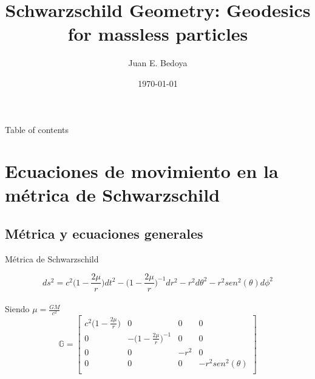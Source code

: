 \documentclass[xcolor=dvipsnames]{beamer}
\title[Schwarzschild geometry]{Schwarzschild Geometry: Geodesics for massless particles}
\date{\today}
\author[Universidad del Valle]{ Juan E. Bedoya }
\institute[]{Universidad del Valle \\ Departamento de física}
\begin{document}
	
	\begin{frame}
		\titlepage
	\end{frame}
	
	\begin{frame}{Table of contents}
    \tableofcontents
	\end{frame}
	
	
	
	\section{Ecuaciones de movimiento en la métrica de Schwarzschild}
	\subsection{Métrica y ecuaciones generales}
	\begin{frame}{Métrica de Schwarzschild}
	    
	    \begin{block}{}

	    \begin{equation*}
	    ds^{2}=c^{2}\Big( 1- \frac{2\mu}{r}\Big) dt^{2}-\Big( 1- \frac{2\mu}{r}\Big)^{-1} dr^{2}-r^{2}d\theta^{2}-r^{2}sen^{2}(\theta)d\phi^{2} 
	    \end{equation*}\\
	   Siendo $\mu=\frac{GM}{c^{2}}$
	\begin{equation*}
	\mathbb{G}= 
      \begin{bmatrix}
      c^{2}\Big( 1- \frac{2\mu}{r}\Big) & 0&0&0\\
      0 &-\Big( 1- \frac{2\mu}{r}\Big)^{-1}&0&0\\
      0&0&-r^{2}&0\\
      0&0&0&-r^{2} sen^{2}(\theta)\\
\end{bmatrix}
\end{equation*}

  \end{block}

	\end{frame}
	
\end{document}
